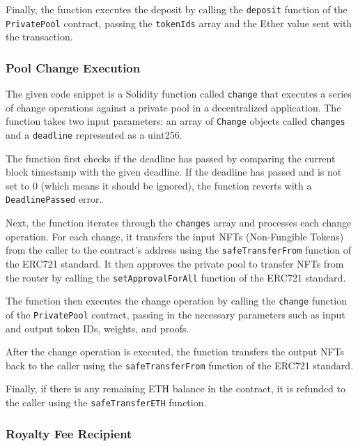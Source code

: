 Finally, the function executes the deposit by calling the
\texttt{deposit} function of the \texttt{PrivatePool} contract, passing
the \texttt{tokenIds} array and the Ether value sent with the
transaction.

\hypertarget{pool-change-execution}{%
\subsubsection{Pool Change Execution}\label{pool-change-execution}}

The given code snippet is a Solidity function called \texttt{change}
that executes a series of change operations against a private pool in a
decentralized application. The function takes two input parameters: an
array of \texttt{Change} objects called \texttt{changes} and a
\texttt{deadline} represented as a uint256.

The function first checks if the deadline has passed by comparing the
current block timestamp with the given deadline. If the deadline has
passed and is not set to 0 (which means it should be ignored), the
function reverts with a \texttt{DeadlinePassed} error.

Next, the function iterates through the \texttt{changes} array and
processes each change operation. For each change, it transfers the input
NFTs (Non-Fungible Tokens) from the caller to the contract's address
using the \texttt{safeTransferFrom} function of the ERC721 standard. It
then approves the private pool to transfer NFTs from the router by
calling the \texttt{setApprovalForAll} function of the ERC721 standard.

The function then executes the change operation by calling the
\texttt{change} function of the \texttt{PrivatePool} contract, passing
in the necessary parameters such as input and output token IDs, weights,
and proofs.

After the change operation is executed, the function transfers the
output NFTs back to the caller using the \texttt{safeTransferFrom}
function of the ERC721 standard.

Finally, if there is any remaining ETH balance in the contract, it is
refunded to the caller using the \texttt{safeTransferETH} function.

\hypertarget{royalty-fee-recipient}{%
\subsubsection{Royalty Fee Recipient}\label{royalty-fee-recipient}}

